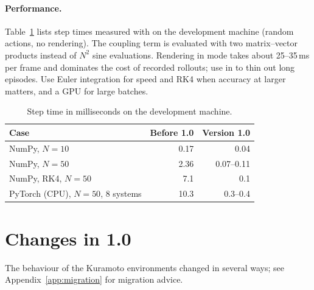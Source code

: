 \paragraph{Performance.} Table~\ref{tab:kuramoto-perf} lists step times
measured with  on the development machine
(random actions, no rendering). The coupling term is evaluated with two
matrix--vector products instead of $N^2$ sine evaluations. Rendering in
 mode takes about 25--35\,ms per frame and dominates the
cost of recorded rollouts; use  in  to
thin out long episodes. Use Euler integration for speed and RK4 when accuracy
at larger  matters, and a GPU for large batches.

\begin{table}[htbp]
  \centering\small
  \caption{Step time in milliseconds on the development machine.}
  \label{tab:kuramoto-perf}
  \begin{tabular}{@{}lrr@{}}
    \toprule
    Case & Before 1.0 & Version 1.0 \\
    \midrule
    NumPy, $N = 10$ & 0.17 & 0.04 \\
    NumPy, $N = 50$ & 2.36 & 0.07--0.11 \\
    NumPy, RK4, $N = 50$ & 7.1 & 0.1 \\
    PyTorch (CPU), $N = 50$, 8 systems & 10.3 & 0.3--0.4 \\
    \bottomrule
  \end{tabular}
\end{table}

\section{Changes in 1.0}\label{sec:kuramoto-changes}

The behaviour of the Kuramoto environments changed in several ways; see
Appendix~\ref{app:migration} for migration advice.

